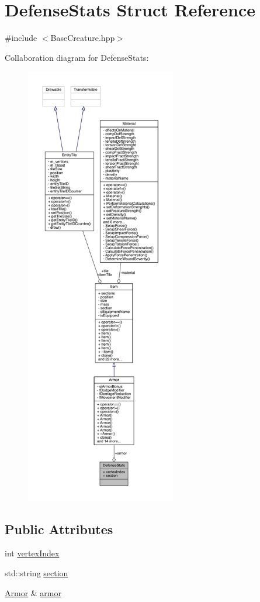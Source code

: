 \hypertarget{struct_defense_stats}{}\section{Defense\+Stats Struct Reference}
\label{struct_defense_stats}


{\ttfamily \#include $<$Base\+Creature.\+hpp$>$}



Collaboration diagram for Defense\+Stats\+:
\nopagebreak
\begin{figure}[H]
\begin{center}
\leavevmode
\includegraphics[height=550pt]{struct_defense_stats__coll__graph}
\end{center}
\end{figure}
\subsection*{Public Attributes}
\begin{DoxyCompactItemize}
\item 
int \mbox{\hyperlink{struct_defense_stats_a495e186aa26d97e4bf2b80ad44e7a260}{vertex\+Index}}
\item 
std\+::string \mbox{\hyperlink{struct_defense_stats_a32afd7fa0576be676dca6fcf8cc33cf5}{section}}
\item 
\mbox{\hyperlink{class_armor}{Armor}} \& \mbox{\hyperlink{struct_defense_stats_ae352b45ea400b564a0ee8e860b0d8525}{armor}}
\end{DoxyCompactItemize}


